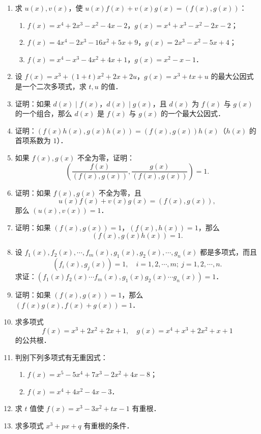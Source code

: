 \begin{enumerate}
\begin{enumerate}
  \anssub
  \end{enumerate}
  \item 求 $u(x),v(x)$，使 $u(x)f(x)+v(x)g(x)=(f(x),g(x))$：
  \begin{enumerate}
    \item $f(x)=x^4+2x^3-x^2-4x-2$，$g(x)=x^4+x^3-x^2-2x-2$；
  \anssub
    \item $f(x)=4x^4-2x^3-16x^2+5x+9$，$g(x)=2x^3-x^2-5x+4$；
  \anssub
    \item $f(x)=x^4-x^3-4x^2+4x+1$，$g(x)=x^2-x-1$．
  \anssub
  \end{enumerate}
  \item 设 $f(x)=x^3+(1+t)x^2+2x+2u$，$g(x)=x^3+tx+u$ 的最大公因式是一个二次多项式，求 $t,u$ 的值．
  \anscompute
  \item 证明：如果 $d(x)\mid f(x)$，$d(x)\mid g(x)$，且 $d(x)$ 为 $f(x)$ 与 $g(x)$ 的一个组合，那么 $d(x)$ 是 $f(x)$ 与 $g(x)$ 的一个最大公因式．
  \ansproof
  \item 证明：$(f(x)h(x),g(x)h(x))=(f(x),g(x))h(x)$（$h(x)$ 的首项系数为 $1$）．
  \ansproof
  \item 如果 $f(x),g(x)$ 不全为零，证明：
  \[
    \left(\frac{f(x)}{(f(x),g(x))},\frac{g(x)}{(f(x),g(x))}\right)=1.
  \]
  \ansproof
  \item 证明：如果 $f(x),g(x)$ 不全为零，且
  \[
    u(x)f(x)+v(x)g(x)=(f(x),g(x)),
  \]
  那么 $(u(x),v(x))=1$．
  \ansproof
  \item 证明：如果 $(f(x),g(x))=1$，$(f(x),h(x))=1$，那么
  \[
    (f(x),g(x)h(x))=1.
  \]
  \ansproof
  \item 设 $f_1(x),f_2(x),\cdots,f_m(x),g_1(x),g_2(x),\cdots,g_n(x)$ 都是多项式，而且
  \[
    (f_i(x),g_j(x))=1,\quad i=1,2,\cdots,m;\ j=1,2,\cdots,n.
  \]
  求证：$(f_1(x)f_2(x)\cdots f_m(x),g_1(x)g_2(x)\cdots g_n(x))=1$．
  \ansproof
  \item 证明：如果 $(f(x),g(x))=1$，那么 $(f(x)g(x),f(x)+g(x))=1$．
  \ansproof
  \item 求多项式
  \[
    f(x)=x^3+2x^2+2x+1,\quad g(x)=x^4+x^3+2x^2+x+1
  \]
  的公共根．
  \anscompute
  \item 判别下列多项式有无重因式：
  \begin{enumerate}
    \item $f(x)=x^5-5x^4+7x^3-2x^2+4x-8$；
  \anssub
    \item $f(x)=x^4+4x^2-4x-3$．
  \anssub
  \end{enumerate}
  \item 求 $t$ 值使 $f(x)=x^3-3x^2+tx-1$ 有重根．
  \anscompute
  \item 求多项式 $x^3+px+q$ 有重根的条件．

\end{enumerate}
